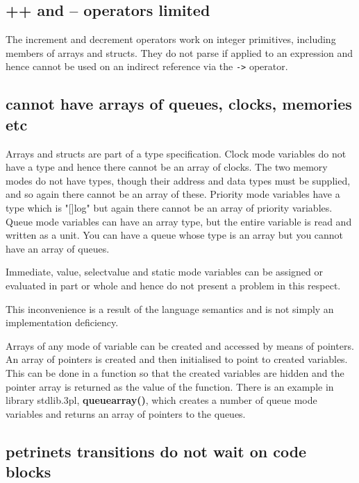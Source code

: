         \subsection{++ and -- operators limited}

            The increment and decrement operators work on integer primitives,
            including members of arrays and structs. They do not parse if
            applied to an expression and hence cannot be used on an indirect
            reference via the \verb'->' operator.

        \subsection{cannot have arrays of queues, clocks, memories etc}

            Arrays and structs are part of a type specification. Clock mode
            variables do not have a type and hence there cannot be an array of
            clocks. The two memory modes do not have types, though their address
            and data types must be supplied, and so again there cannot be an
            array of these. Priority mode variables have a type which is "[]log"
            but again there cannot be an array of priority variables. Queue mode
            variables can have an array type, but the entire variable is read
            and written as a unit. You can have a queue whose type is an array
            but you cannot have an array of queues.

            Immediate, value, selectvalue and static mode variables can be
            assigned or evaluated in part or whole and hence do not present a
            problem in this respect.

            This inconvenience is a result of the language semantics and is not
            simply an implementation deficiency.

            Arrays of any mode of variable can be created and accessed by means
            of pointers. An array of pointers is created and then initialised to
            point to created variables. This can be done in a function so that
            the created variables are hidden and the pointer array is returned
            as the value of the function. There is an example in library
            stdlib.3pl, {\bf queuearray()}, which creates a number of queue mode
            variables and returns an array of pointers to the queues.

        \subsection{petrinets transitions do not wait on code blocks}

